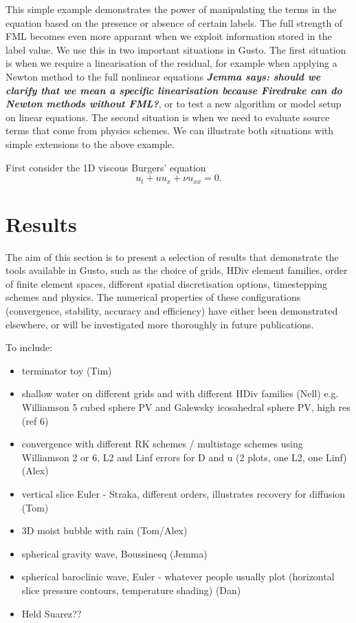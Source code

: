 \documentclass[journal abbreviation, manuscript]{copernicus}
\newcommand{\JScomment}[1]{\textit{\textbf{Jemma says: #1}}}
\begin{document}
This simple example demonstrates the power of manipulating the terms
in the equation based on the presence or absence of certain
labels. The full strength of FML becomes even more apparant when we
exploit information stored in the label value. We use this in two
important situations in Gusto. The first situation is when we require
a linearisation of the residual, for example when applying a Newton
method to the full nonlinear equations \JScomment{should we clarify
  that we mean a specific linearisation because Firedrake can do
  Newton methods without FML?}, or to test a new algorithm or model
setup on linear equations. The second situation is when we need to
evaluate source terms that come from physics schemes. We can
illustrate both situations with simple extensions to the above
example.

First consider the 1D viscous Burgers' equation
\begin{equation}
  u_t + uu_x + \nu u_{xx} = 0.
\end{equation}


\section{Results}
\label{sec: results}
The aim of this section is to present a selection of results that
demonstrate the tools available in Gusto, such as the choice of grids,
HDiv element families, order of finite element spaces, different
spatial discretisation options, timestepping schemes and physics. The
numerical properties of these configurations (convergence, stability,
accuracy and efficiency) have either been demonstrated elsewhere, or
will be investigated more thoroughly in future publications.

To include:
\begin{itemize}
\item terminator toy (Tim)
\item shallow water on different grids and with different HDiv
  families (Nell) e.g. Williamson 5 cubed sphere PV and Galewsky
  icosahedral sphere PV, high res (ref 6)
\item convergence with different RK schemes / multistage schemes using
  Williamson 2 or 6, L2 and Linf errors for D and u (2 plots, one L2,
  one Linf) (Alex)
\item vertical slice Euler - Straka, different orders, illustrates
  recovery for diffusion (Tom)
\item 3D moist bubble with rain (Tom/Alex)
\item spherical gravity wave, Boussinesq (Jemma)
\item spherical baroclinic wave, Euler - whatever people usually plot
  (horizontal slice pressure contours, temperature shading) (Dan)
\item Held Suarez??
\end{itemize}
\end{document}
